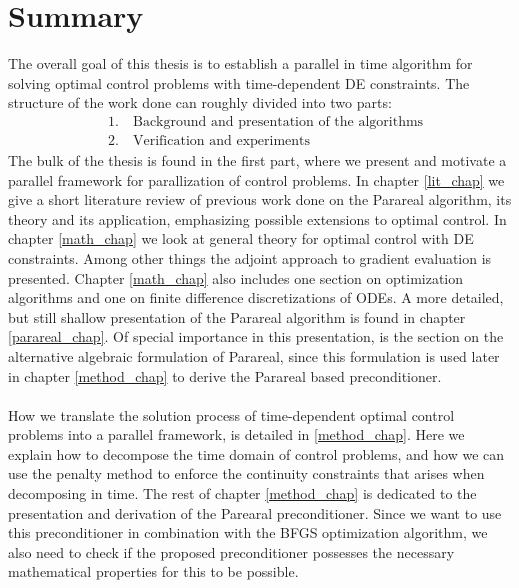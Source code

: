 \section{Summary}
The overall goal of this thesis is to establish a parallel in time algorithm for solving optimal control problems with time-dependent DE constraints. The structure of the work done can roughly divided into two parts:
\begin{align*}
&1.\quad \textrm{Background and presentation of the algorithms} \\
&2.\quad \textrm{Verification and experiments}
\end{align*}
The bulk of the thesis is found in the first part, where we present and motivate a parallel framework for parallization of control problems. In chapter \ref{lit_chap} we give a short literature review of previous work done on the Parareal algorithm, its theory and its application, emphasizing possible extensions to optimal control. In chapter \ref{math_chap} we look at general theory for optimal control with DE constraints. Among other things the adjoint approach to gradient evaluation is presented. Chapter \ref{math_chap} also includes one section on optimization algorithms and one on finite difference discretizations of ODEs. A more detailed, but still shallow presentation of the Parareal algorithm is found in chapter \ref{parareal_chap}. Of special importance in this presentation, is the section on the alternative algebraic formulation of Parareal, since this formulation is used later in chapter \ref{method_chap} to derive the Parareal based preconditioner.
\\
\\
How we translate the solution process of time-dependent optimal control problems into a parallel framework, is detailed in \ref{method_chap}. Here we explain how to decompose the time domain of control problems, and how we can use the penalty method to enforce the continuity constraints that arises when decomposing in time. The rest of chapter \ref{method_chap} is dedicated to the presentation and derivation of the Parearal preconditioner. Since we want to use this preconditioner in combination with the BFGS optimization algorithm, we also need to check if the proposed preconditioner possesses the necessary mathematical properties for this to be possible. 
\\
\\
